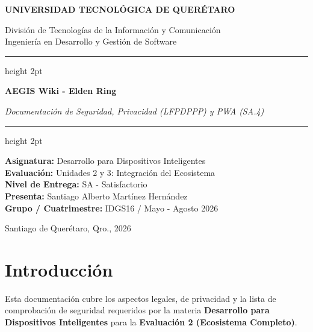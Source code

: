 \documentclass[11pt,a4paper]{article}
\begin{document}
\begin{titlepage}
    \centering
    \vspace*{0.5cm}
    {\fontsize{18}{22}\selectfont \textbf{UNIVERSIDAD TECNOLÓGICA DE QUERÉTARO} \par}
    \vspace{0.6cm}
    {\fontsize{14}{17}\selectfont División de Tecnologías de la Información y Comunicación \\ 
    Ingeniería en Desarrollo y Gestión de Software \par}
    \vspace{1.5cm}
    
    {\color{brown}\hrule height 2pt}
    \vspace{0.6cm}
    {\fontsize{20}{24}\selectfont \textbf{AEGIS Wiki - Elden Ring} \par}
    \vspace{0.4cm}
    {\fontsize{16}{20}\selectfont \textit{Documentación de Seguridad, Privacidad (LFPDPPP) y PWA (SA.4)} \par}
    \vspace{0.6cm}
    {\color{brown}\hrule height 2pt}
    
    \vspace{1.5cm}
    {\fontsize{12}{15}\selectfont
    \textbf{Asignatura:} Desarrollo para Dispositivos Inteligentes \\
    \vspace{0.2cm}
    \textbf{Evaluación:} Unidades 2 y 3: Integración del Ecosistema \\
    \vspace{0.2cm}
    \textbf{Nivel de Entrega:} SA - Satisfactorio \\
    \vspace{0.2cm}
    \textbf{Presenta:} Santiago Alberto Martínez Hernández \\
    \vspace{0.2cm}
    \textbf{Grupo / Cuatrimestre:} IDGS16 / Mayo - Agosto 2026 \par}
    
    \vfill
    {\large Santiago de Querétaro, Qro., 2026 \par}
\end{titlepage}

\newpage

\section{Introducción}
Esta documentación cubre los aspectos legales, de privacidad y la lista de comprobación de seguridad requeridos por la materia \textbf{Desarrollo para Dispositivos Inteligentes} para la \textbf{Evaluación 2 (Ecosistema Completo)}.
\end{document}
